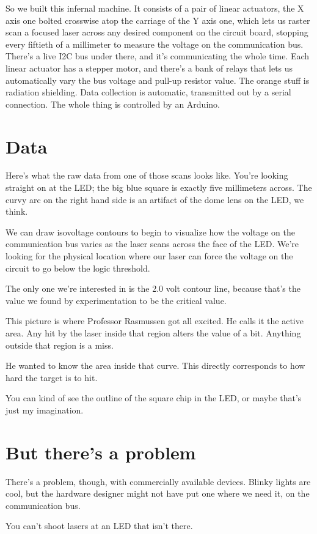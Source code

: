 \documentclass[letterpaper]{article}
\begin{document}
So we built this infernal machine. It consists of a pair of linear actuators,
the X axis one bolted crosswise atop the carriage of the Y axis one, which lets
us raster scan a focused laser across any desired component on the circuit
board, stopping every fiftieth of a millimeter to measure the voltage on the
communication bus. There's a live I2C bus under there, and it's communicating
the whole time. Each linear actuator has a stepper motor, and there's a bank of
relays that lets us automatically vary the bus voltage and pull-up resistor
value. The orange stuff is radiation shielding. Data collection is automatic,
transmitted out by a serial connection. The whole thing is controlled by an
Arduino.
\section{Data}
Here's what the raw data from one of those scans looks like. You're looking
straight on at the LED; the big blue square is exactly five millimeters across.
The curvy arc on the right hand side is an artifact of the dome lens on the
LED, we think.

We can draw isovoltage contours to begin to visualize how the voltage on the
communication bus varies as the laser scans across the face of the LED. We're
looking for the physical location where our laser can force the voltage on the
circuit to go below the logic threshold.

The only one we're interested in is the 2.0 volt contour line, because that's
the value we found by experimentation to be the critical value.

This picture is where Professor Rasmussen got all excited. He calls it the
active area. Any hit by the laser inside that region alters the value of a bit.
Anything outside that region is a miss.

He wanted to know the area inside that curve. This directly corresponds to how
hard the target is to hit.

You can kind of see the outline of the square chip in the LED, or maybe that's
just my imagination.
\section{But there's a problem}
There's a problem, though, with commercially available devices. Blinky lights
are cool, but the hardware designer might not have put one where we need it, on
the communication bus.

You can't shoot lasers at an LED that isn't there.
\end{document}
